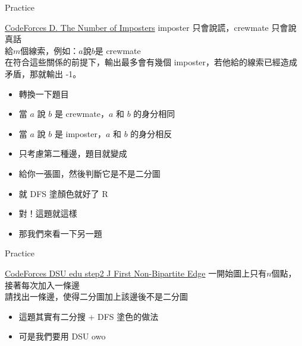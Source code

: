 \documentclass[aspectratio=169]{beamer}
\begin{document}
    \begin{frame}{Practice}
        \begin{block}{\href{https://codeforces.com/problemset/problem/1594/D}{CodeForces D. The Number of Imposters}}
        imposter 只會說謊，crewmate 只會說真話\\
        給$m$個線索，例如：$a$說$b$是 crewmate\\
        在符合這些關係的前提下，輸出最多會有幾個 imposter，若他給的線索已經造成矛盾，那就輸出 -1。
        \end{block}
        \begin{itemize}
            \item<2-> 轉換一下題目
            \item<2-> 當 $a$ 說 $b$ 是 crewmate，$a$ 和 $b$ 的身分相同
            \item<2-> 當 $a$ 說 $b$ 是 imposter，$a$ 和 $b$ 的身分相反
            \item<3-> 只考慮第二種邊，題目就變成
            \item<3-> 給你一張圖，然後判斷它是不是二分圖
            \item<4-> 就 DFS 塗顏色就好了 R
            \item<5-> 對！這題就這樣
            \item<6-> 那我們來看一下另一題
        \end{itemize}
    \end{frame}
    \begin{frame}{Practice}
         \begin{block}{\href{https://codeforces.com/edu/course/2/lesson/7/2/practice/contest/289391/problem/J}{CodeForces DSU edu step2 J First Non-Bipartite Edge}}
         一開始圖上只有$n$個點，接著每次加入一條邊\\請找出一條邊，使得二分圖加上該邊後不是二分圖
        \end{block}
        \begin{itemize}
            \item<2-> 這題其實有二分搜 + DFS 塗色的做法
            \item<2-> 可是我們要用 DSU owo
        \end{itemize}
    \end{frame}
\end{document}
